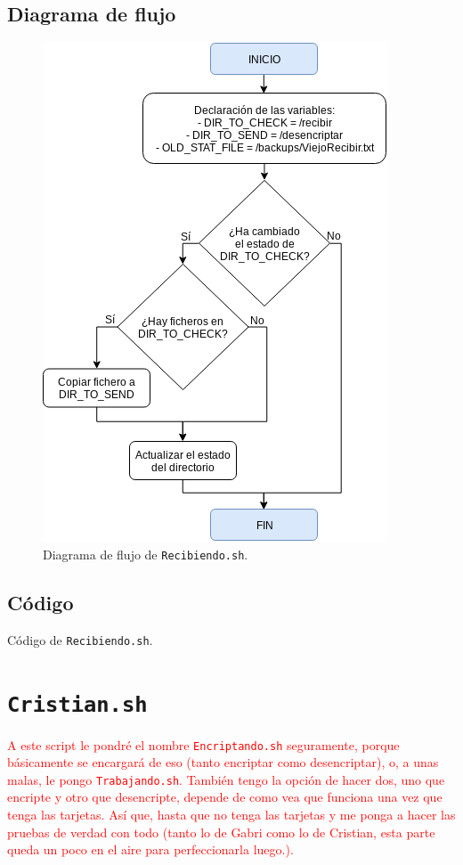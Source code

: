 \subsection{Diagrama de flujo}
\begin{figure}[h]
	\centering
	\includegraphics[scale=0.8]{Anexos/Anexo3/Diagramas/Recibiendo.png}
	\caption{Diagrama de flujo de \texttt{Recibiendo.sh}.}
	\label{Diagrama de flujo de Recibiendo.sh}
\end{figure}

\subsection{Código}

\begin{center}
	Código de \texttt{Recibiendo.sh}.
\end{center}

\section{\texttt{Cristian.sh}}
\textcolor{red}{A este script le pondré el nombre \texttt{Encriptando.sh} seguramente, porque básicamente se encargará de eso (tanto encriptar como desencriptar), o, a unas malas, le pongo \texttt{Trabajando.sh}. También tengo la opción de hacer dos, uno que encripte y otro que desencripte, depende de como vea que funciona una vez que tenga las tarjetas. Así que, hasta que no tenga las tarjetas y me ponga a hacer las pruebas de verdad con todo (tanto lo de Gabri como lo de Cristian, esta parte queda un poco en el aire para perfeccionarla luego.).}

